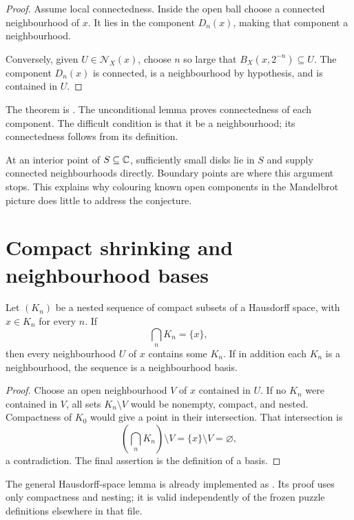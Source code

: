 \begin{proof}
Assume local connectedness.  Inside the open ball choose a connected
neighbourhood of $x$.  It lies in the component $D_n(x)$, making that
component a neighbourhood.

Conversely, given $U\in\mathcal N_X(x)$, choose $n$ so large that
$B_X(x,2^{-n})\subseteq U$.  The component $D_n(x)$ is connected,
is a neighbourhood by hypothesis, and is contained in $U$.
\end{proof}

The theorem is
.
The unconditional lemma  proves
connectedness of each component.  The difficult condition is that it be a
neighbourhood; its connectedness follows from its definition.

At an interior point of $S\subseteq\mathbb C$, sufficiently small disks lie in
$S$ and supply connected neighbourhoods directly.  Boundary points are
where this argument stops.  This explains why colouring known open
components in the Mandelbrot picture does little to address the
conjecture.

\section{Compact shrinking and neighbourhood bases}

\begin{lemma}
\label{lem:compact-singleton-basis}
Let $(K_n)$ be a nested sequence of compact subsets of a Hausdorff space,
with $x\in K_n$ for every $n$.  If
\[
 \bigcap_n K_n=\{x\},
\]
then every neighbourhood $U$ of $x$ contains some $K_n$.  If in addition
each $K_n$ is a neighbourhood, the sequence is a neighbourhood basis.
\end{lemma}

\begin{proof}
Choose an open neighbourhood $V$ of $x$ contained in $U$.  If no $K_n$
were contained in $V$, all sets $K_n\setminus V$ would be nonempty,
compact, and nested.  Compactness of $K_0$ would give a point in their
intersection.  That intersection is
\[
 \left(\bigcap_n K_n\right)\setminus V=\{x\}\setminus V=\varnothing,
\]
a contradiction.  The final assertion is the definition of a basis.
\end{proof}

The general Hausdorff-space lemma is already implemented as
.
Its proof uses only compactness and nesting; it is valid independently
of the frozen puzzle definitions elsewhere in that file.

